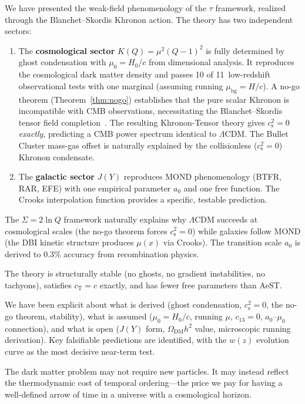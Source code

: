 \documentclass[prd,twocolumn,superscriptaddress,longbibliography,floatfix]{revtex4-2}
\newcommand{\tauasym}{\tau}
\newcommand{\cs}{c_{\mathrm{s}}}
\newcommand{\cT}{c_{\mathrm{T}}}
\begin{document}
We have presented the weak-field phenomenology of the $\tauasym$
framework, realized through the Blanchet--Skordis Khronon action.
The theory has two independent sectors:

\begin{enumerate}
\item The \textbf{cosmological sector} $K(Q) = \mu^2(Q-1)^2$
  is fully determined by ghost condensation with
  $\mu_0 = H_0/c$ from dimensional analysis.  It reproduces
  the cosmological dark matter density and passes 10 of
  11~low-redshift observational tests with one marginal
  (assuming running $\mu_{\mathrm{bg}} = H/c$).
  A no-go theorem (Theorem~\ref{thm:nogo}) establishes that
  the pure scalar Khronon is incompatible with CMB observations,
  necessitating the Blanchet--Skordis tensor field
  completion~\cite{BS2025}.  The resulting Khronon-Tensor theory
  gives $\cs^2 = 0$ \emph{exactly}, predicting a CMB power
  spectrum identical to $\Lambda$CDM.  The Bullet Cluster
  mass-gas offset is naturally explained by the collisionless
  ($\cs^2 = 0$) Khronon condensate.
\item The \textbf{galactic sector} $J(Y)$ reproduces MOND
  phenomenology (BTFR, RAR, EFE) with one empirical parameter
  $a_0$ and one free function.  The Crooks interpolation
  function provides a specific, testable prediction.
\end{enumerate}

The $\Sigma = 2\ln Q$ framework naturally explains why $\Lambda$CDM
succeeds at cosmological scales (the no-go theorem forces $\cs^2 = 0$)
while galaxies follow MOND (the DBI kinetic structure produces
$\mu(x)$ via Crooks).  The transition scale $a_0$ is derived to
0.3\% accuracy from recombination physics.

The theory is structurally stable (no ghosts, no gradient
instabilities, no tachyons), satisfies $\cT = c$ exactly,
and has fewer free parameters than AeST.

We have been explicit about what is derived (ghost condensation,
$\cs^2 = 0$, the no-go theorem, stability), what is assumed
($\mu_0 = H_0/c$, running $\mu$, $c_{13} = 0$,
$a_0$--$\mu_0$ connection), and
what is open ($J(Y)$ form, $\Omega_{\mathrm{DM}}h^2$ value,
microscopic running derivation).  Key falsifiable
predictions are identified, with the $w(z)$ evolution
curve as the most decisive near-term test.

The dark matter problem may not require new particles.
It may instead reflect the thermodynamic cost of temporal
ordering---the price we pay for having a well-defined arrow
of time in a universe with a cosmological horizon.
\end{document}
